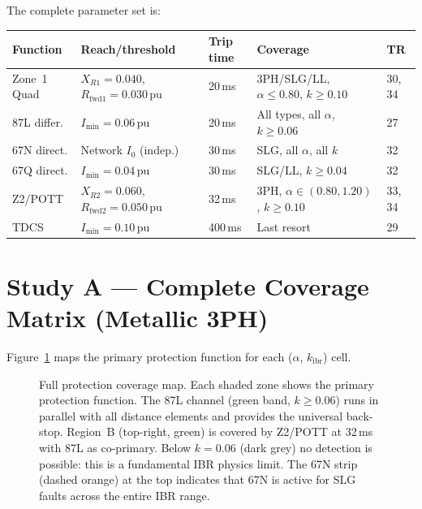 \documentclass[11pt,a4paper]{article}
\begin{document}
\noindent
The complete parameter set is:
\begin{center}
\begin{tabular}{@{}lllll@{}}
\toprule
Function & Reach/threshold & Trip time & Coverage & TR\\
\midrule
Zone~1 Quad & $X_{R1}=0.040$, $R_\mathrm{fwd1}=0.030$\,pu & 20\,ms &
  3PH/SLG/LL, $\alpha\leq0.80$, $k\geq0.10$ & 30, 34\\
87L differ. & $I_\mathrm{min}=0.06$\,pu & 20\,ms &
  All types, all $\alpha$, $k\geq0.06$ & 27\\
67N direct. & Network $I_0$ (indep.) & 30\,ms &
  SLG, all $\alpha$, all $k$ & 32\\
67Q direct. & $I_\mathrm{min}=0.04$\,pu & 30\,ms &
  SLG/LL, $k\geq0.04$ & 32\\
Z2/POTT & $X_{R2}=0.060$, $R_\mathrm{fwd2}=0.050$\,pu & 32\,ms &
  3PH, $\alpha\in(0.80,1.20)$, $k\geq0.10$ & 33, 34\\
TDCS & $I_\mathrm{min}=0.10$\,pu & 400\,ms &
  Last resort & 29\\
\bottomrule
\end{tabular}
\end{center}

\section{Study A --- Complete Coverage Matrix (Metallic 3PH)}
\label{sec:studyA}

Figure~\ref{fig:coverage} maps the primary protection function for each
($\alpha$, $k_\mathrm{ibr}$) cell.

\begin{figure}[htbp]
  \centering
  \resizebox{0.82\textwidth}{!}{%
  }
  \caption{Full protection coverage map.  Each shaded zone shows the primary
           protection function.  The 87L channel (green band, $k\geq0.06$)
           runs in parallel with all distance elements and provides the
           universal back-stop.  Region~B (top-right, green) is covered by
           Z2/POTT at 32\,ms with 87L as co-primary.  Below $k=0.06$ (dark
           grey) no detection is possible: this is a fundamental IBR physics
           limit.  The 67N strip (dashed orange) at the top indicates that
           67N is active for SLG faults across the entire IBR range.}
  \label{fig:coverage}
\end{figure}
\end{document}

